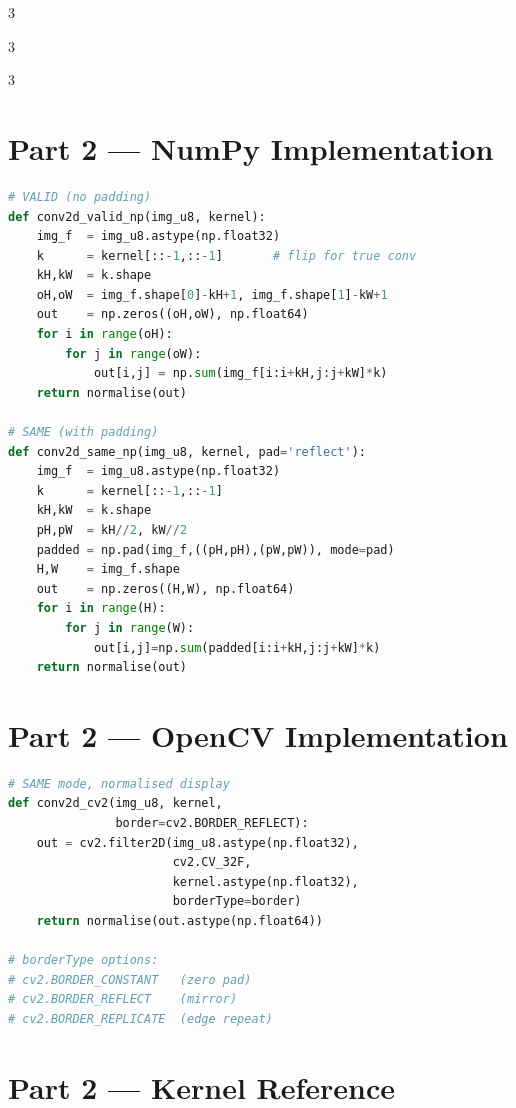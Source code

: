 \documentclass[9pt,landscape,a4paper]{extarticle}
\begin{document}
\begin{multicols*}{3}
\begin{multicols*}{3}
\begin{multicols}{3}
\section{Part 2 — NumPy Implementation}

\begin{lstlisting}[language=Python]
# VALID (no padding)
def conv2d_valid_np(img_u8, kernel):
    img_f  = img_u8.astype(np.float32)
    k      = kernel[::-1,::-1]       # flip for true conv
    kH,kW  = k.shape
    oH,oW  = img_f.shape[0]-kH+1, img_f.shape[1]-kW+1
    out    = np.zeros((oH,oW), np.float64)
    for i in range(oH):
        for j in range(oW):
            out[i,j] = np.sum(img_f[i:i+kH,j:j+kW]*k)
    return normalise(out)

# SAME (with padding)
def conv2d_same_np(img_u8, kernel, pad='reflect'):
    img_f  = img_u8.astype(np.float32)
    k      = kernel[::-1,::-1]
    kH,kW  = k.shape
    pH,pW  = kH//2, kW//2
    padded = np.pad(img_f,((pH,pH),(pW,pW)), mode=pad)
    H,W    = img_f.shape
    out    = np.zeros((H,W), np.float64)
    for i in range(H):
        for j in range(W):
            out[i,j]=np.sum(padded[i:i+kH,j:j+kW]*k)
    return normalise(out)
\end{lstlisting}

\section{Part 2 — OpenCV Implementation}

\begin{lstlisting}[language=Python]
# SAME mode, normalised display
def conv2d_cv2(img_u8, kernel,
               border=cv2.BORDER_REFLECT):
    out = cv2.filter2D(img_u8.astype(np.float32),
                       cv2.CV_32F,
                       kernel.astype(np.float32),
                       borderType=border)
    return normalise(out.astype(np.float64))

# borderType options:
# cv2.BORDER_CONSTANT   (zero pad)
# cv2.BORDER_REFLECT    (mirror)
# cv2.BORDER_REPLICATE  (edge repeat)
\end{lstlisting}

\section{Part 2 — Kernel Reference}


\end{multicols}
\end{multicols*}
\end{multicols*}
\end{document}
